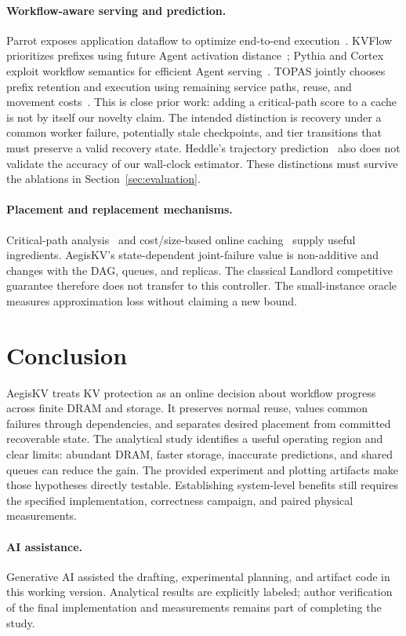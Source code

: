 \documentclass[sigplan,10pt,anonymous,nonacm]{acmart}
\begin{document}
\paragraph{Workflow-aware serving and prediction.}
Parrot exposes application dataflow to optimize end-to-end
execution~\cite{lin2024parrot}. KVFlow prioritizes prefixes using future
Agent activation distance~\cite{pan2025kvflow}; Pythia and Cortex exploit
workflow semantics for efficient Agent serving~\cite{yu2026pythia,pagonas2025cortex}.
TOPAS jointly chooses prefix retention and execution using remaining
service paths, reuse, and movement costs~\cite{ni2026topas}. This is close
prior work: adding a critical-path score to a cache is not by itself our
novelty claim. The intended distinction is recovery under a common worker
failure, potentially stale checkpoints, and tier transitions that must
preserve a valid recovery state. Heddle's trajectory
prediction~\cite{zhang2026heddle} also does not validate the accuracy of our
wall-clock estimator. These distinctions must survive the ablations in
Section~\ref{sec:evaluation}.

\paragraph{Placement and replacement mechanisms.}
Critical-path analysis~\cite{kelley1959cpm} and cost/size-based online
caching~\cite{young2002landlord} supply useful ingredients. AegisKV's
state-dependent joint-failure value is non-additive and changes with the
DAG, queues, and replicas. The classical Landlord competitive guarantee
therefore does not transfer to this controller. The small-instance oracle
measures approximation loss without claiming a new bound.

\section{Conclusion}
\label{sec:conclusion}

AegisKV treats KV protection as an online decision about workflow progress
across finite DRAM and storage. It preserves normal reuse, values common
failures through dependencies, and separates desired placement from
committed recoverable state. The analytical study identifies a useful
operating region and clear limits: abundant DRAM, faster storage, inaccurate
predictions, and shared queues can reduce the gain. The provided experiment
and plotting artifacts make those hypotheses directly testable. Establishing
system-level benefits still requires the specified implementation,
correctness campaign, and paired physical measurements.

\paragraph{AI assistance.}
Generative AI assisted the drafting, experimental planning, and artifact
code in this working version. Analytical results are explicitly labeled;
author verification of the final implementation and measurements remains
part of completing the study.



\end{document}
